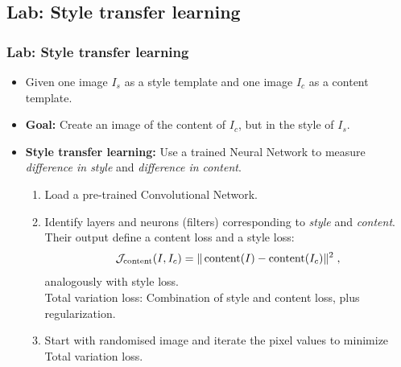 \documentclass[10pt,hyperref={pdfpagelabels=false}]{beamer}
\begin{document}
\subsection{Lab: Style transfer learning}
\begin{frame}[allowframebreaks]
    \frametitle{Lab: Style transfer learning}
    \begin{itemize}
        \item Given one image $I_s$ as a style template and one image $I_c$ as a content template.
        \item {\bf Goal:} Create an image of the content of $I_c$, but in the style of $I_s$.
        \framebreak
        \item {\bf Style transfer learning:} Use a trained Neural Network to measure \emph{difference in style} and \emph{difference in content}.
        \begin{enumerate}
            \item Load a pre-trained Convolutional Network.
            \item Identify layers and neurons (filters) corresponding to \emph{style} and \emph{content}. \\
            Their output define a content loss and a style loss:
            $$
                \mathcal{J}_{\text{content}}(I, I_c) = \|\operatorname{content}(I)-\operatorname{content}(I_c)\|^2\;,
            $$
            analogously with style loss.\\
            Total variation loss: Combination of style and content loss, plus regularization.
            \item Start with randomised image and iterate the pixel values to minimize Total variation loss.
        \end{enumerate}
    \end{itemize}
\end{frame}
\end{document}
